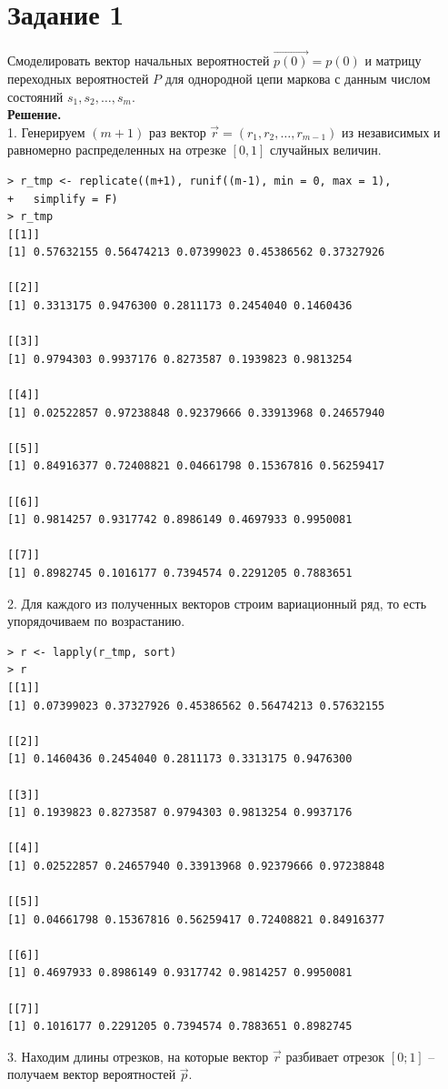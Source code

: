 \documentclass[14pt,a4paper]{scrartcl}
\begin{document}
\section*{Задание 1}

Смоделировать вектор начальных вероятностей $\vec{p(0)} = p(0)$ и матрицу переходных вероятностей $P$ для однородной цепи маркова с данным числом состояний ${s_1,s_2,…,s_m}$.\\
\textbf{Решение.}\\
1. Генерируем $(m+1)$ раз вектор $\vec{r}=(r_1,r_2,…,r_{m-1})$ из независимых и равномерно распределенных на отрезке $[0,1]$ случайных величин.
\begin{verbatim}
> r_tmp <- replicate((m+1), runif((m-1), min = 0, max = 1), 
+	simplify = F)
> r_tmp
[[1]]
[1] 0.57632155 0.56474213 0.07399023 0.45386562 0.37327926

[[2]]
[1] 0.3313175 0.9476300 0.2811173 0.2454040 0.1460436

[[3]]
[1] 0.9794303 0.9937176 0.8273587 0.1939823 0.9813254

[[4]]
[1] 0.02522857 0.97238848 0.92379666 0.33913968 0.24657940

[[5]]
[1] 0.84916377 0.72408821 0.04661798 0.15367816 0.56259417

[[6]]
[1] 0.9814257 0.9317742 0.8986149 0.4697933 0.9950081

[[7]]
[1] 0.8982745 0.1016177 0.7394574 0.2291205 0.7883651
\end{verbatim}


2. Для каждого из полученных векторов строим вариационный ряд, то есть упорядочиваем по возрастанию.

\begin{verbatim}
> r <- lapply(r_tmp, sort)
> r
[[1]]
[1] 0.07399023 0.37327926 0.45386562 0.56474213 0.57632155

[[2]]
[1] 0.1460436 0.2454040 0.2811173 0.3313175 0.9476300

[[3]]
[1] 0.1939823 0.8273587 0.9794303 0.9813254 0.9937176

[[4]]
[1] 0.02522857 0.24657940 0.33913968 0.92379666 0.97238848

[[5]]
[1] 0.04661798 0.15367816 0.56259417 0.72408821 0.84916377

[[6]]
[1] 0.4697933 0.8986149 0.9317742 0.9814257 0.9950081

[[7]]
[1] 0.1016177 0.2291205 0.7394574 0.7883651 0.8982745
\end{verbatim}

3. Находим длины отрезков, на которые вектор $\vec{r}$ разбивает отрезок $[0;1]$ -- получаем вектор вероятностей $\vec{p}$.
\end{document}
